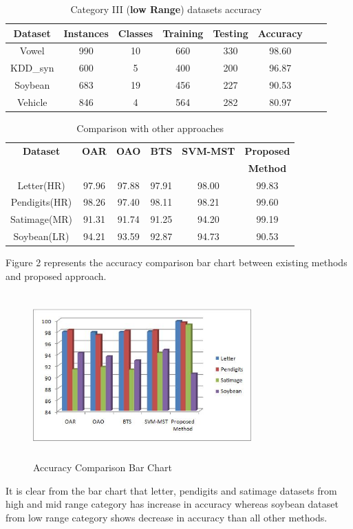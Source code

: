 \documentclass[a4paper, 10pt, conference]{ieeeconf}      %
\begin{document}
\begin{table}[h!]
  \centering
  \caption{Category III (\textbf{low Range}) datasets accuracy}
  \label{tab:table4}
  \begin{tabular}{|c|c|c|c|c|c|c|c|}
   \hline
   \textbf{Dataset} & \textbf{Instances} & \textbf{Classes} & \textbf{Training} & \textbf{Testing} & \textbf{Accuracy}\\
   \hline 
   Vowel & 990  & 10 & 660 & 330 & 98.60 \\
   \hline
   KDD\_syn & 600 & 5 & 400 & 200 & 96.87  \\
   \hline
   Soybean & 683 & 19 & 456 & 227 & 90.53 \\
   \hline 
   Vehicle & 846 & 4 & 564 & 282 & 80.97 \\
   \hline
  \end{tabular}
\end{table}

\begin{table}[h!]
  \centering
  \caption{Comparison with other approaches}
  \label{tab:table5}
	\begin{tabular}{|c|c|c|c|c|c|}
   \hline
   \textbf{Dataset} &  \textbf{OAR}  &  \textbf{OAO} &  \textbf{BTS} &	\textbf{SVM-MST} &  \textbf{Proposed} \\
    &   &  &  &	 &  \textbf{Method} \\    
	\hline
	Letter(HR)  & 97.96  & 97.88 & 97.91 & 98.00 & 99.83\\
	\hline
 	Pendigits(HR)  & 98.26 & 97.40 & 98.11 & 98.21 & 99.60 \\ 
	\hline
    Satimage(MR)  & 91.31 & 91.74  & 91.25 & 94.20 & 99.19 \\ 
	\hline
	Soybean(LR)  &  94.21 & 93.59 & 92.87 & 94.73 & 90.53\\
	\hline
\end{tabular}
\end{table}
Figure 2 represents the accuracy comparison bar chart between existing methods and proposed approach.
\begin{figure}[h!] 
\hspace{0.2cm}\includegraphics[scale=0.5,height=2.5in,width=3.3in]{chart.JPG}
\caption{Accuracy Comparison Bar Chart}  
\end{figure}
It is clear from the bar chart that letter, pendigits and satimage datasets from high and mid range category has increase in accuracy whereas soybean dataset from low range category shows decrease in accuracy than all other methods. 
\end{document}
